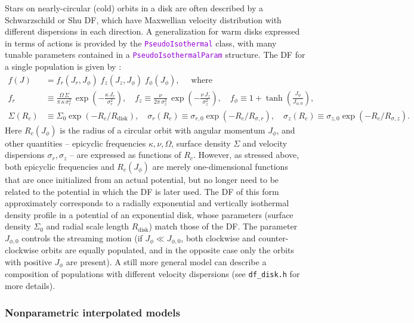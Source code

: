 \documentclass[12pt]{article}
\newcommand{\ttt}[1]{\textcolor{darkviolet}{\texttt{#1}}}
\begin{document}
Stars on nearly-circular (cold) orbits in a disk are often described by a Schwarzschild or Shu DF, which have Maxwellian velocity distribution with different dispersions in each direction. A generalization for warm disks expressed in terms of actions is provided by the \ttt{PseudoIsothermal} class, with many tunable parameters contained in a \ttt{PseudoIsothermalParam} structure. The DF for a single population is given by \cite{BinneyMcMillan2011}:
\begin{align*}
f(J) &= f_r(J_r, J_\phi)\; f_z(J_z, J_\phi)\; f_\phi(J_\phi) , \quad \mbox{ where} \\
f_r  &\equiv \frac{\Omega\, \Sigma}{\pi\, \kappa\, \sigma_r^2}\, \exp\left(-\frac{\kappa\,J_r}{\sigma_r^2}\right) ,\quad
f_z  \equiv \frac{\nu}{2\pi\, \sigma_z^2 }\,\exp\left(-\frac{\nu\,J_z}{\sigma_z^2}\right) , \quad
f_\phi \equiv 1 + \tanh\left( \frac{J_\phi}{J_{\phi,0}} \right) , \\
\Sigma(R_c)  &\equiv \Sigma_0 \exp( -R_c / R_\mathrm{disk} ) , \quad
\sigma_r(R_c) \equiv \sigma_{r,0} \exp( -R_c / R_{\sigma,r} ) , \quad
\sigma_z(R_c) \equiv \sigma_{z,0} \exp( -R_c / R_{\sigma,z} ) .
\end{align*}
Here $R_c(J_\phi)$ is the radius of a circular orbit with angular momentum $J_\phi$, and other quantities -- epicyclic frequencies $\kappa,\nu,\Omega$, surface density $\Sigma$ and velocity dispersions $\sigma_r,\sigma_z$ -- are expressed as functions of $R_c$. However, as stressed above, both epicyclic frequencies and $R_c(J_\phi)$ are merely one-dimensional functions that are once initialized from an actual potential, but no longer need to be related to the potential in which the DF is later used. The DF of this form approximately corresponds to a radially exponential and vertically isothermal density profile in a potential of an exponential disk, whose parameters (surface density $\Sigma_0$ and radial scale length $R_\mathrm{disk}$) match those of the DF. The parameter $J_{\phi,0}$ controls the streaming motion (if $J_\phi \ll J_{\phi,0}$, both clockwise and counter-clockwise orbits are equally populated, and in the opposite case only the orbits with positive $J_\phi$ are present).
A still more general model can describe a composition of populations with different velocity dispersions (see \texttt{df_disk.h} for more details).

\subsubsection{Nonparametric interpolated models}  \label{sec:DFinterpolated}
\end{document}
